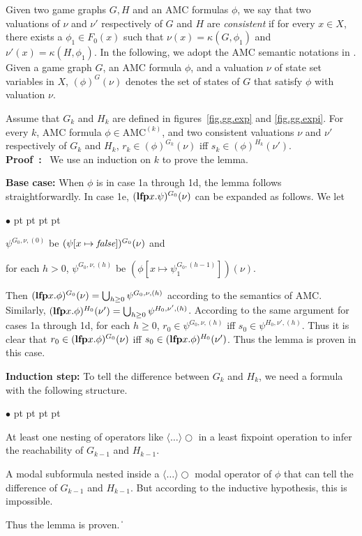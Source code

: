 \documentclass[11pt]{article}
\newcommand{\emlfp}{\mbox{\bf lfp}}
\newcommand{\false}{\mbox{\em false}}
\newcommand{\pf}{\noindent\mbox{\bf Proof : }}
\newcommand{\nxt}{\bigcirc}
\def\qed{\ifmmode\|\else{\unskip\nobreak\hfil
\penalty50\hskip1em\null\nobreak\hfil$\blacksquare$
\parfillskip=0pt\finalhyphendemerits=0\endgraf}\fi}
\newenvironment{list1}{\begin{list}{$\bullet$}
{\topsep 0 pt \parsep 0 pt \partopsep 0 pt \itemsep 0 pt}}{\end{list}}
\begin{document}
Given two game graphs $G,H$ and
an AMC formulas $\phi$,
we say that
two valuations of $\nu$ and $\nu'$ respectively of $G$ and $H$
are {\em consistent} if for every $x\in X$,
there exists a $\phi_1\in F_0(x)$ such that
$\nu(x)=\kappa(G,\phi_1)$ and $\nu'(x)=\kappa(H,\phi_1)$.
In the following, we adopt the AMC semantic notations in \cite{AHK02}.
Given a game graph $G$, an AMC formula $\phi$,
and a valuation $\nu$ of state set variables in $X$,
$(\phi)^G(\nu)$ denotes the set of states of $G$ that
satisfy $\phi$ with valuation $\nu$.







{\lemma\label{lemma.amc.induction}
Assume that $G_k$ and $H_k$ are defined in
figures~\ref{fig.gg.exp} and \ref{fig.gg.expi}.
For every $k$, AMC formula $\phi\in \mbox{AMC}^{(k)}$, and two consistent
valuations $\nu$ and $\nu'$ respectively of $G_k$ and $H_k$,
$r_k\in (\phi)^{G_k}(\nu)$ iff
$s_k\in (\phi)^{H_k}(\nu')$.
}
\\\pf
We use an induction on $k$ to prove the lemma.

\noindent
{\bf Base case:} 
When $\phi$ is in case 1a through 1d, the lemma follows straightforwardly.
In case 1e,
$(\emlfp x.\psi)^{G_0}(\nu)$ can be expanded as follows.
We let
\begin{list1}
\item $\psi^{G_0,\nu,(0)}$ be $(\psi[x\mapsto \false])^{G_0}(\nu)$ and
\item for each $h>0$,
    $\psi^{G_0,\nu,(h)}$ be $(\phi[x\mapsto \psi_1^{G_0,(h-1)}])(\nu)$.
\end{list1}
Then $(\emlfp x.\phi)^{G_0}(\nu)=\bigcup_{h\geq 0}\psi^{G_0,\nu,(h)}$
according to the semantics of AMC.
Similarly, \linebreak 
$(\emlfp x.\phi)^{H_0}(\nu')=\bigcup_{h\geq 0}\psi^{H_0,\nu',(h)}$.
According to the same argument for cases 1a through 1d,
for each $h\geq 0$,
$r_0\in \psi^{G_0,\nu,(h)}$ iff
$s_0\in \psi^{H_0,\nu',(h)}$.
Thus it is clear that
$r_0\in (\emlfp x.\phi)^{G_0}(\nu)$ iff
$s_0\in (\emlfp x.\phi)^{H_0}(\nu')$.
Thus the lemma is proven in this case.

\noindent
{\bf Induction step:}
To tell the difference between $G_k$ and $H_k$,
we need a formula with the following structure.
\begin{list1}
\item At least one nesting of operators
    like $\langle\ldots\rangle\nxt$ in a least fixpoint operation 
    to infer the reachability of $G_{k-1}$ and $H_{k-1}$.
\item A modal subformula nested inside a $\langle \ldots\rangle \nxt$
    modal operator of $\phi$ that can tell the difference
    of $G_{k-1}$ and $H_{k-1}$.  
    But according to the inductive hypothesis, this is impossible.  
\end{list1}
Thus the lemma is proven.
\qed
\end{document}
